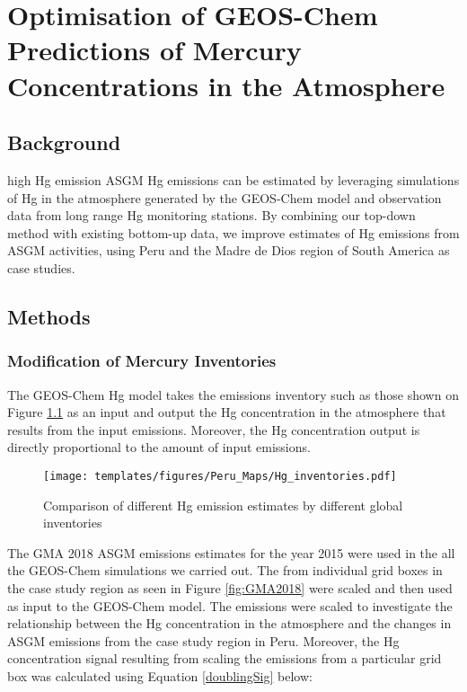 \chapter{Optimisation of GEOS-Chem Predictions of Mercury Concentrations in the Atmosphere}
\section{Background}

high Hg emission ASGM Hg emissions can be estimated by leveraging simulations of Hg in the atmosphere generated by the GEOS-Chem model and observation data from long range Hg monitoring stations. By combining our top-down method with existing bottom-up data, we improve estimates of Hg emissions from ASGM activities, using Peru and the Madre de Dios region of South America as case studies.

\section{Methods}

\subsection{Modification of Mercury Inventories}
\begin{flushleft}
The GEOS-Chem Hg model takes the emissions inventory such as those shown on Figure \ref{fig:Hg_inventories} as an input and output the Hg concentration in the atmosphere that results from the input emissions. Moreover, the Hg concentration output is directly proportional to the amount of input emissions. 
\end{flushleft}
\begin{figure}[H]
  \texttt{[image: templates/figures/Peru\_Maps/Hg\_inventories.pdf]}
  \centering
  \caption{Comparison of different Hg emission estimates by different global inventories}
  \label{fig:Hg_inventories}
  
\end{figure}
\FloatBarrier
\begin{flushleft}
The GMA 2018 ASGM emissions estimates for the year 2015 were used in the all the GEOS-Chem simulations we carried out. The  from individual grid boxes in the case study region as seen in Figure \ref{fig:GMA2018} were scaled and then used as input to the GEOS-Chem model. The emissions were scaled to investigate the relationship between the Hg concentration in the atmosphere and the changes in ASGM emissions from the case study region in Peru. Moreover, the Hg concentration signal resulting from scaling the emissions from a particular grid box was calculated using Equation \ref{doublingSig} below:
\end{flushleft}

